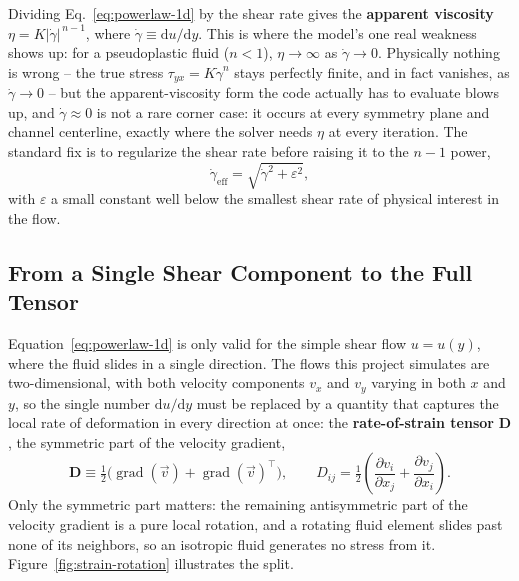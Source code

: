 \documentclass[11pt]{article}
\newcommand{\vv}{\vec{v}}
\begin{document}
Dividing Eq.~\eqref{eq:powerlaw-1d} by the shear rate gives the \textbf{apparent viscosity} $\eta = K|\dot\gamma|^{\,n-1}$, where $\dot\gamma\equiv\mathrm{d}u/\mathrm{d}y$. This is where the model's one real weakness shows up: for a pseudoplastic fluid ($n<1$), $\eta\to\infty$ as $\dot\gamma\to0$. Physically nothing is wrong -- the true stress $\tau_{yx}=K\dot\gamma^n$ stays perfectly finite, and in fact vanishes, as $\dot\gamma\to0$ -- but the apparent-viscosity form the code actually has to evaluate blows up, and $\dot\gamma\approx0$ is not a rare corner case: it occurs at every symmetry plane and channel centerline, exactly where the solver needs $\eta$ at every iteration. The standard fix is to regularize the shear rate before raising it to the $n-1$ power,
\begin{equation}
  \dot\gamma_{\mathrm{eff}} = \sqrt{\dot\gamma^2+\varepsilon^2},
  \label{eq:reg-1d}
\end{equation}
with $\varepsilon$ a small constant well below the smallest shear rate of physical interest in the flow.

\subsection{From a Single Shear Component to the Full Tensor}

Equation~\eqref{eq:powerlaw-1d} is only valid for the simple shear flow $u=u(y)$, where the fluid slides in a single direction. The flows this project simulates are two-dimensional, with both velocity components $v_x$ and $v_y$ varying in both $x$ and $y$, so the single number $\mathrm{d}u/\mathrm{d}y$ must be replaced by a quantity that captures the local rate of deformation in every direction at once: the \textbf{rate-of-strain tensor} $\mathbf{D}$, the symmetric part of the velocity gradient,
\begin{equation}
  \mathbf{D} \equiv \tfrac{1}{2}\big(\operatorname{grad}(\vv) + \operatorname{grad}(\vv)^\top\big), \qquad D_{ij} = \tfrac{1}{2}\left(\frac{\partial v_i}{\partial x_j}+\frac{\partial v_j}{\partial x_i}\right).
  \label{eq:strain-rate}
\end{equation}
Only the symmetric part matters: the remaining antisymmetric part of the velocity gradient is a pure local rotation, and a rotating fluid element slides past none of its neighbors, so an isotropic fluid generates no stress from it. Figure~\ref{fig:strain-rotation} illustrates the split.
\end{document}
